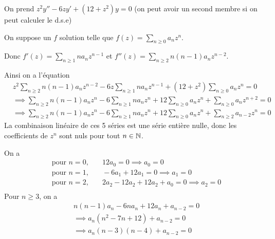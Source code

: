 \documentclass[a4paper, 12pt]{article}
\begin{document}
\begin{exemple}
    On prend $z^2 y'' - 6 z y' + (12 + z^2) y = 0$ (on peut avoir un second membre si on peut calculer le d.s.e)

    On suppose un $f$ solution telle que $f(z) = \sum_{n \geq 0} a_n z^n$.

    Donc $f'(z) = \sum_{n \geq 1} n a_n z^{n - 1}$ et $f''(z) = \sum_{n \geq 2} n (n - 1) a_n z^{n - 2}$.

    Ainsi on a l'équation
    \begin{align*}
        &z^2 \sum_{n \geq 2} n (n - 1) a_n z^{n - 2} - 6 z \sum_{n \geq 1} n a_n z^{n - 1} + (12 + z^2) \sum_{n \geq 0} a_n z^n = 0 \\
        &\implies \sum_{n \geq 2} n (n - 1) a_n z^n - 6 \sum_{n \geq 1} n a_n z^n + 12 \sum_{n \geq 0} a_n z^n + \sum_{n \geq 0} a_n z^{n + 2} = 0 \\
        &\implies \sum_{n \geq 2} n (n - 1) a_n z^n - 6 \sum_{n \geq 1} n a_n z^n + 12 \sum_{n \geq 0} a_n z^n + \sum_{n \geq 2} a_{n-2} z^n = 0
    \end{align*}
    La combinaison linéaire de ces 5 séries est une série entière nulle, donc les coefficients de $z^n$ sont nuls pour tout $n \in \mathbb{N}$.

    On a
    \begin{align*}
        &\text{pour } n = 0, &\quad 12 a_0 = 0 \implies a_0 = 0 \\
        &\text{pour } n = 1, &\quad -6 a_1 + 12 a_1 = 0 \implies a_1 = 0 \\
        &\text{pour } n = 2, &\quad 2 a_2 - 12 a_2 + 12 a_2 + a_0 = 0 \implies a_2 = 0 \\
    \end{align*}
    Pour $n \geq 3$, on a
    \begin{align*}
        &n (n - 1) a_n - 6 n a_n + 12 a_n + a_{n - 2} = 0 \\
        &\implies a_n(n^2 - 7 n + 12) + a_{n - 2} = 0 \\
        &\implies a_n(n - 3)(n - 4) + a_{n - 2} = 0 \\
    \end{align*}
\end{exemple}
\end{document}
